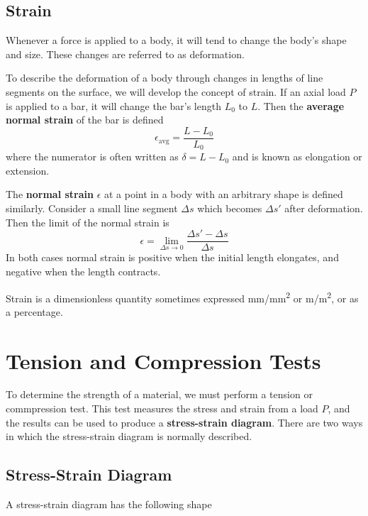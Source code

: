 \documentclass{article}
\begin{document}
\subsection{Strain}
\begin{definition}[Deformation]
    Whenever a force is applied to a body, it will tend to change the body's shape and size.
    These changes are referred to as deformation.
\end{definition}
\begin{definition}[Strain]
    To describe the deformation of a body through changes in lengths of line segments on the surface, 
    we will develop the concept of strain.
    If an axial load \(P\) is applied to a bar, it will change the bar's length \(L_0\) to \(L\). 
    Then the \textbf{average normal strain} of the bar is defined
    \begin{equation*}
        \epsilon_{\mathrm{avg}} = \frac{L - L_0}{L_0}
    \end{equation*}
    where the numerator is often written as \(\delta = L - L_0\) and is known as elongation or extension.

    The \textbf{normal strain} \(\epsilon\) at a point in a body with an arbitrary shape is defined similarly.
    Consider a small line segment \(\Delta s\) which becomes \(\Delta s'\) after deformation. Then the limit of the normal strain
    is
    \begin{equation*}
        \epsilon = \lim_{\Delta s \to 0} \frac{\Delta s' - \Delta s}{\Delta s}
    \end{equation*}
    In both cases normal strain is positive when the initial length elongates, and negative when the length contracts.

    Strain is a dimensionless quantity sometimes expressed \unit{mm/mm^{2}} or \unit{m/m^{2}}, or as a percentage.
\end{definition}
\section{Tension and Compression Tests}
To determine the strength of a material, we must perform a tension or commpression test.
This test measures the stress and strain from a load \(P\), and the results can be used to 
produce a \textbf{stress-strain diagram}.
There are two ways in which the stress-strain diagram is normally described.
\subsection{Stress-Strain Diagram}
A stress-strain diagram has the following shape
\end{document}
